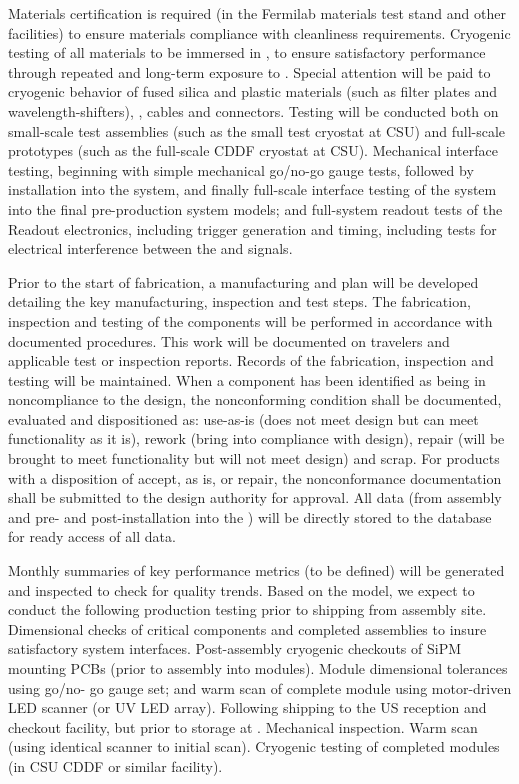 Materials certification is required (in the Fermilab materials test
stand and other facilities) to ensure materials compliance with
cleanliness requirements. Cryogenic testing of all materials to be
immersed in , to ensure satisfactory performance through repeated
and long-term exposure to . Special attention will be paid to
cryogenic behavior of fused silica and plastic materials (such as
filter plates and wavelength-shifters), , cables and
connectors. Testing will be conducted both on small-scale test
assemblies (such as the small test cryostat at CSU) and full-scale
prototypes (such as the full-scale CDDF cryostat at CSU). Mechanical
interface testing, beginning with simple mechanical go/no-go gauge
tests, followed by installation into the  system, and
finally full-scale interface testing of the  system into the final
pre-production  system models; and full-system readout tests of the
 Readout electronics, including trigger generation and timing,
including tests for electrical interference between the  and 
signals.

Prior to the start of fabrication, a manufacturing and  plan will be
developed detailing the key manufacturing, inspection and test
steps. The fabrication, inspection and testing of the components will
be performed in accordance with documented procedures. This work will
be documented on travelers and applicable test or inspection
reports. Records of the fabrication, inspection and testing will be
maintained. When a component has been identified as being in
noncompliance to the design, the nonconforming condition shall be
documented, evaluated and dispositioned as: use-as-is (does not meet
design but can meet functionality as it is), rework (bring into
compliance with design), repair (will be brought to meet functionality
but will not meet design) and scrap. For products with a disposition
of accept, as is, or repair, the nonconformance documentation shall be
submitted to the design authority for approval. All  data (from
assembly and pre- and post-installation into the ) will be directly
stored to the  database for ready access of all  data.

Monthly summaries of key performance metrics (to be defined) will be
generated and inspected to check for quality trends. Based on the
 model, we expect to conduct the following production
testing prior to shipping from assembly site. Dimensional checks of
critical components and completed assemblies to insure satisfactory
system interfaces. Post-assembly cryogenic checkouts of SiPM mounting
PCBs (prior to assembly into  modules). Module dimensional
tolerances using go/no- go gauge set; and warm scan of complete module
using motor-driven LED scanner (or UV LED array).  Following shipping
to the US reception and checkout facility, but prior to storage at
. Mechanical inspection. Warm scan (using identical scanner to
initial scan). Cryogenic testing of completed modules (in CSU CDDF or
similar facility).

